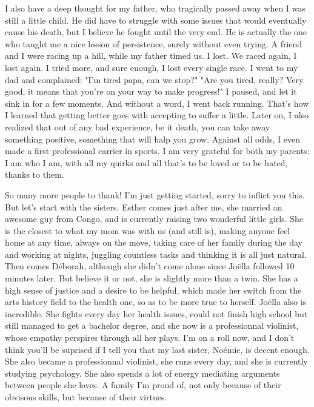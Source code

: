 I also have a deep thought for my father, who tragically passed away when I was still a little child. He did have to struggle with some issues that would eventually cause his death, but I believe he fought until the very end. He is actually the one who taught me a nice lesson of persistence, surely without even trying. A friend and I were racing up a hill, while my father timed us. I lost. We raced again, I lost again. I tried more, and sure enough, I lost every single race. I went to my dad and complained: "I'm tired papa, can we stop?" "Are you tired, really? Very good, it means that you're on your way to make progress!" I paused, and let it sink in for a few moments. And without a word, I went back running. That's how I learned that getting better goes with accepting to suffer a little. Later on, I also realized that out of any bad experience, be it death, you can take away something positive, something that will halp you grow. Against all odds, I even made a first professional carrier in sports. I am very grateful for both my parents: I am who I am, with all my quirks and all that's to be loved or to be hated, thanks to them.

So many more people to thank! I'm just getting started, sorry to inflict you this. But let's start with the sisters. Esther comes just after me, she married an awesome guy from Congo, and is currently raising two wonderful little girls. She is the closest to what my mom was with us (and still is), making anyone feel home at any time, always on the move, taking care of her family during the day and working at nights, juggling countless tasks and thinking it is all just natural. Then comes Déborah, although she didn't come alone since Joëlla followed 10 minutes later. But believe it or not, she is slightly more than a twin. She has a high sense of justice and a desire to be helpful, which made her switch from the arts history field to the health one, so as to be more true to herself. Joëlla also is incredible. She fights every day her health issues, could not finish high school but still managed to get a bachelor degree, and she now is a professionnal violinist, whose empathy perspires through all her plays. I'm on a roll now, and I don't think you'll be suprised if I tell you that my last sister, Noémie, is decent enough. She also became a professionnal violinist, she runs every day, and she is currently studying psychology. She also spends a lot of energy mediating arguments between people she loves. A family I'm proud of, not only because of their obvisous skills, but because of their virtues.

